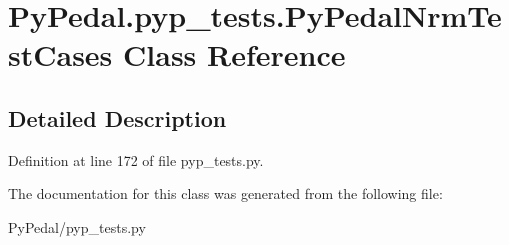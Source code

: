 \hypertarget{classPyPedal_1_1pyp__tests_1_1PyPedalNrmTestCases}{
\section{PyPedal.pyp\_\-tests.PyPedalNrmTestCases Class Reference}
\label{classPyPedal_1_1pyp__tests_1_1PyPedalNrmTestCases}
}


\subsection{Detailed Description}


Definition at line 172 of file pyp\_\-tests.py.



The documentation for this class was generated from the following file:\begin{DoxyCompactItemize}
\item 
PyPedal/pyp\_\-tests.py\end{DoxyCompactItemize}
